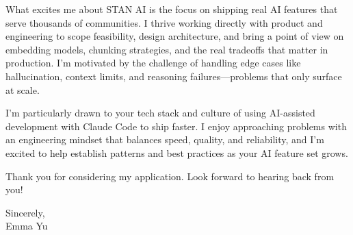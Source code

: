 \documentclass[12pt,a4paper,roman]{moderncv}
\begin{document}
\begin{justify}
What excites me about STAN AI is the focus on shipping real AI features that serve thousands of communities. I thrive working directly with product and engineering to scope feasibility, design architecture, and bring a point of view on embedding models, chunking strategies, and the real tradeoffs that matter in production. I'm motivated by the challenge of handling edge cases like hallucination, context limits, and reasoning failures—problems that only surface at scale.

I'm particularly drawn to your tech stack and culture of using AI-assisted development with Claude Code to ship faster. I enjoy approaching problems with an engineering mindset that balances speed, quality, and reliability, and I'm excited to help establish patterns and best practices as your AI feature set grows.


Thank you for considering my application. Look forward to hearing back from you! 

\vspace{0.5cm}
\end{justify}

Sincerely,   \\
Emma Yu
\end{document}
